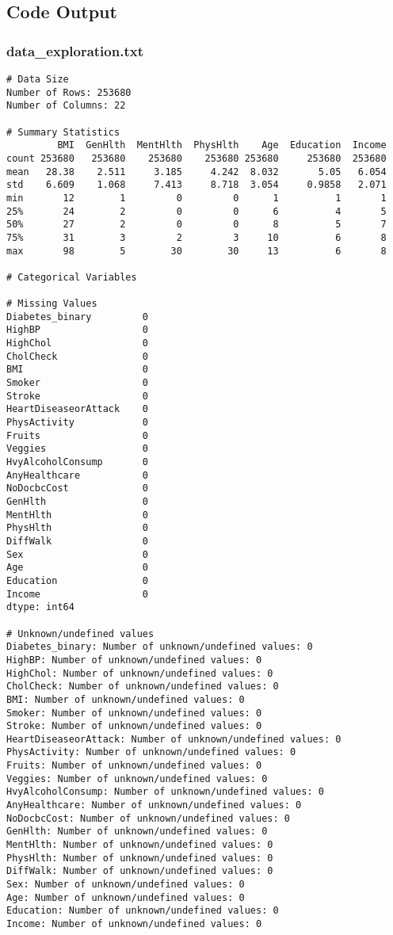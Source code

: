 \documentclass[11pt]{article}
\begin{document}
\subsection{Code Output}

\subsubsection*{data\_exploration.txt}

\begin{Verbatim}[tabsize=4]
# Data Size
Number of Rows: 253680
Number of Columns: 22

# Summary Statistics
         BMI  GenHlth  MentHlth  PhysHlth    Age  Education  Income
count 253680   253680    253680    253680 253680     253680  253680
mean   28.38    2.511     3.185     4.242  8.032       5.05   6.054
std    6.609    1.068     7.413     8.718  3.054     0.9858   2.071
min       12        1         0         0      1          1       1
25%       24        2         0         0      6          4       5
50%       27        2         0         0      8          5       7
75%       31        3         2         3     10          6       8
max       98        5        30        30     13          6       8

# Categorical Variables

# Missing Values
Diabetes_binary         0
HighBP                  0
HighChol                0
CholCheck               0
BMI                     0
Smoker                  0
Stroke                  0
HeartDiseaseorAttack    0
PhysActivity            0
Fruits                  0
Veggies                 0
HvyAlcoholConsump       0
AnyHealthcare           0
NoDocbcCost             0
GenHlth                 0
MentHlth                0
PhysHlth                0
DiffWalk                0
Sex                     0
Age                     0
Education               0
Income                  0
dtype: int64

# Unknown/undefined values
Diabetes_binary: Number of unknown/undefined values: 0
HighBP: Number of unknown/undefined values: 0
HighChol: Number of unknown/undefined values: 0
CholCheck: Number of unknown/undefined values: 0
BMI: Number of unknown/undefined values: 0
Smoker: Number of unknown/undefined values: 0
Stroke: Number of unknown/undefined values: 0
HeartDiseaseorAttack: Number of unknown/undefined values: 0
PhysActivity: Number of unknown/undefined values: 0
Fruits: Number of unknown/undefined values: 0
Veggies: Number of unknown/undefined values: 0
HvyAlcoholConsump: Number of unknown/undefined values: 0
AnyHealthcare: Number of unknown/undefined values: 0
NoDocbcCost: Number of unknown/undefined values: 0
GenHlth: Number of unknown/undefined values: 0
MentHlth: Number of unknown/undefined values: 0
PhysHlth: Number of unknown/undefined values: 0
DiffWalk: Number of unknown/undefined values: 0
Sex: Number of unknown/undefined values: 0
Age: Number of unknown/undefined values: 0
Education: Number of unknown/undefined values: 0
Income: Number of unknown/undefined values: 0

\end{Verbatim}
\end{document}
